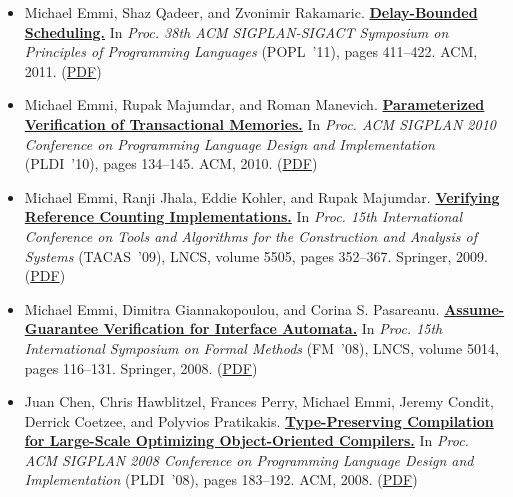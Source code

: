\documentclass{article}
\begin{document}
\begin{itemize}[leftmargin=0cm,label={}]
    \item Michael Emmi, Shaz Qadeer, and Zvonimir Rakamaric. {\bf\href{%
    http://doi.acm.org/10.1145/1926385.1926432}{%
    Delay-Bounded Scheduling.}} In \emph{ Proc. 38th ACM SIGPLAN-SIGACT Symposium on Principles of Programming Languages } (POPL ’11), pages 411–422. ACM, 2011. (\href{https://michael-emmi.github.io/https://github.com/michael-emmi/research-papers/raw/master/conf-popl-EmmiQR11.pdf}{PDF})


    \item Michael Emmi, Rupak Majumdar, and Roman Manevich. {\bf\href{%
    http://doi.acm.org/10.1145/1806596.1806613}{%
    Parameterized Verification of Transactional Memories.}} In \emph{ Proc. ACM SIGPLAN 2010 Conference on Programming Language Design and Implementation } (PLDI ’10), pages 134–145. ACM, 2010. (\href{https://michael-emmi.github.io/https://github.com/michael-emmi/research-papers/raw/master/conf-pldi-EmmiMM10.pdf}{PDF})


    \item Michael Emmi, Ranji Jhala, Eddie Kohler, and Rupak Majumdar. {\bf\href{%
    http://dx.doi.org/10.1007/978-3-642-00768-2_30}{%
    Verifying Reference Counting Implementations.}} In \emph{ Proc. 15th International Conference on Tools and Algorithms for the Construction and Analysis of Systems } (TACAS ’09), LNCS, volume 5505, pages 352–367. Springer, 2009. (\href{https://michael-emmi.github.io/https://github.com/michael-emmi/research-papers/raw/master/conf-tacas-EmmiJKM09.pdf}{PDF})


    \item Michael Emmi, Dimitra Giannakopoulou, and Corina S. Pasareanu. {\bf\href{%
    http://dx.doi.org/10.1007/978-3-540-68237-0_10}{%
    Assume-Guarantee Verification for Interface Automata.}} In \emph{ Proc. 15th International Symposium on Formal Methods } (FM ’08), LNCS, volume 5014, pages 116–131. Springer, 2008. (\href{https://michael-emmi.github.io/https://github.com/michael-emmi/research-papers/raw/master/conf-fm-EmmiGP08.pdf}{PDF})


    \item Juan Chen, Chris Hawblitzel, Frances Perry, Michael Emmi, Jeremy Condit, Derrick Coetzee, and Polyvios Pratikakis. {\bf\href{%
    http://doi.acm.org/10.1145/1375581.1375604}{%
    Type-Preserving Compilation for Large-Scale Optimizing Object-Oriented Compilers.}} In \emph{ Proc. ACM SIGPLAN 2008 Conference on Programming Language Design and Implementation } (PLDI ’08), pages 183–192. ACM, 2008. (\href{https://michael-emmi.github.io/https://github.com/michael-emmi/research-papers/raw/master/conf-pldi-ChenHPECCP08.pdf}{PDF})



\end{itemize}
\end{document}

